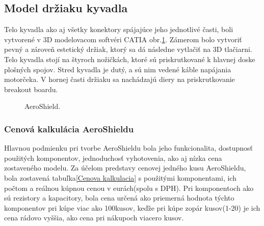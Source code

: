 \subsection{Model držiaku kyvadla}
\label{telo}

Telo kyvadla ako aj všetky konektory spájajúce jeho jednotlivé časti, boli vytvorené v 3D modelovacom softvéri CATIA obr.\ref{OBRAZOK 1.1}. Zámerom bolo vytvoriť pevný a zároveň estetický držiak, ktorý sa dá následne vytlačiť na 3D tlačiarni. Telo kyvadla stojí na štyroch nožičkách, ktoré sú priskrutkované k hlavnej doske plošných spojov. Stred kyvadla je dutý, a sú nim vedené káble napájania motorčeka. V hornej časti držiaku sa nachádzajú diery na priskrutkovanie breakout boardu. 

\begin{figure}
	\hfill
	\hfill
	\hfill
	\caption{AeroShield.}\label{OBRAZOK 1.1}
\end{figure}


\subsubsection{Cenová kalkulácia AeroShieldu}

Hlavnou podmienku pri tvorbe AeroShieldu bola jeho funkcionalita, dostupnosť použitých komponentov, jednoduchosť vyhotovenia, ako aj nízka cena zostaveného modelu. Za účelom predstavy cenovej jedného kusu AeroShieldu, bola zostavená tabuľka\ref{Cenova kalkulacia} s použitými komponentami, ich počtom a reálnou kúpnou cenou v eurách(spolu s DPH). Pri komponentoch ako sú rezistory a kapacitory, bola cena určená ako priemerná hodnota týchto komponentov pri kúpe viac ako 100kusov, keďže pri kúpe zopár kusov(1-20) je ich cena rádovo vyššia, ako cena pri nákupoch viacero kusov. 

